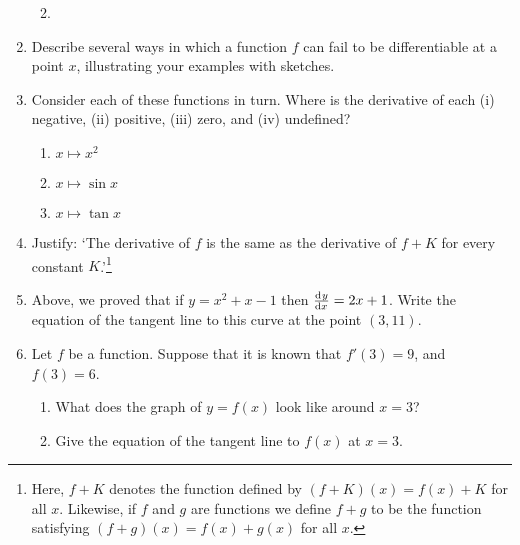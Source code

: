 \begin{enumerate}
\begin{multicols}{2}
\begin{enumerate}
      \item
    \end{enumerate}
    \end{multicols}
  \item Describe several ways in which a function $ f $ can fail to be differentiable at a point $ x $, illustrating your examples with sketches.
  \item Consider each of these functions in turn. Where is the derivative of each (i) negative, (ii) positive, (iii) zero, and (iv) undefined?
    \begin{enumerate}
      \item $ x \mapsto x^2 $
      \item $ x \mapsto \sin x $
      \item $ x \mapsto \tan x $
    \end{enumerate}
  \item Justify: `The derivative of $ f $ is the same as the derivative of $ f + K $ for every constant $ K $.'\footnote{Here, $ f + K $ denotes
        the function defined by $ (f + K)(x) = f(x) + K $ for all $ x $. Likewise, if $ f $ and $ g $ are functions we define $ f + g $ to
        be the function satisfying $ (f + g)(x) = f(x) + g(x) $ for all $ x $.}
  \item Above, we proved that if $ y = x^2 + x - 1 $ then $ \od{y}{x} = 2x + 1 $. Write the equation of the
        tangent line to this curve at the point $ (3, 11) $.
  \item Let $ f $ be a function. Suppose that it is known that $ f'(3) = 9 $, and $ f(3) = 6 $.
    \begin{enumerate}
      \item What does the graph of $ y = f(x) $ look like around $ x = 3 $?
      \item Give the equation of the tangent line to $ f(x) $ at $ x = 3 $.

\end{enumerate}
\end{enumerate}

